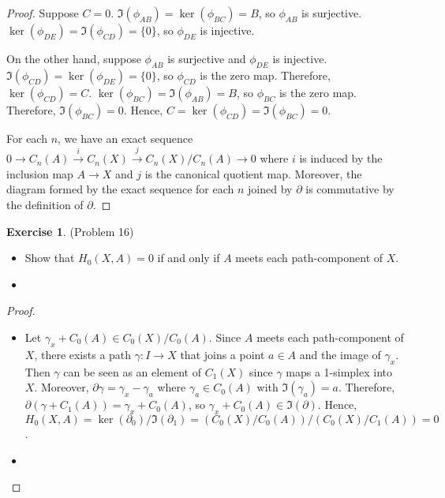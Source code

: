 \documentclass[12pt, psamsfonts]{amsart}
\theoremstyle{definition}
\newtheorem*{exer}{Exercise}
\theoremstyle{remark}
\numberwithin{equation}{section}
\begin{document}
\begin{proof}
  Suppose $C = 0$.
  $\Im(\phi_{AB}) = \ker(\phi_{BC}) = B$, so $\phi_{AB}$ is surjective.
  $\ker(\phi_{DE}) = \Im(\phi_{CD}) = \{ 0 \}$, so $\phi_{DE}$ is injective.

  On the other hand, suppose $\phi_{AB}$ is surjective and $\phi_{DE}$ is injective.
  $\Im(\phi_{CD}) = \ker(\phi_{DE}) = \{ 0 \}$, so $\phi_{CD}$ is the zero map.
  Therefore, $\ker(\phi_{CD}) = C$.
  $\ker(\phi_{BC}) = \Im(\phi_{AB}) = B$, so $\phi_{BC}$ is the zero map.
  Therefore, $\Im(\phi_{BC}) = 0$.
  Hence, $C = \ker(\phi_{CD}) = \Im(\phi_{BC}) = 0$.

  For each $n$, we have an exact sequence $0 \rightarrow C_n(A) \xrightarrow{i} C_n(X) \xrightarrow{j} C_n(X)/C_n(A) \rightarrow 0$ where $i$ is induced by the inclusion map $A \rightarrow X$ and $j$ is the canonical quotient map.
  Moreover, the diagram formed by the exact sequence for each $n$ joined by $\partial$ is commutative by the definition of $\partial$.
\end{proof}

\begin{exer}{(Problem 16)}
  \begin{itemize}
    \item
      Show that $H_0(X, A) = 0$ if and only if $A$ meets each path-component of $X$.
    \item
  \end{itemize}
\end{exer}

\begin{proof}
  $ $
  \begin{itemize}
    \item
      Let $\gamma_x + C_0(A) \in C_0(X) / C_0(A)$.
      Since $A$ meets each path-component of $X$, there exists a path $\gamma: I \rightarrow X$ that joins a point $a \in A$ and the image of $\gamma_x$.
      Then $\gamma$ can be seen as an element of $C_1(X)$ since $\gamma$ maps a 1-simplex into $X$.
      Moreover, $\partial\gamma = \gamma_x - \gamma_a$ where $\gamma_a \in C_0(A)$ with $\Im(\gamma_a) = a$.
      Therefore, $\partial(\gamma + C_1(A)) = \gamma_x + C_0(A)$, so $\gamma_x + C_0(A) \in \Im(\partial)$.
      Hence, $H_0(X, A) = \ker(\partial_0)/\Im(\partial_1) = (C_0(X)/C_0(A)) / (C_0(X)/C_1(A)) = 0$.

    \item
  \end{itemize}
\end{proof}
\end{document}
